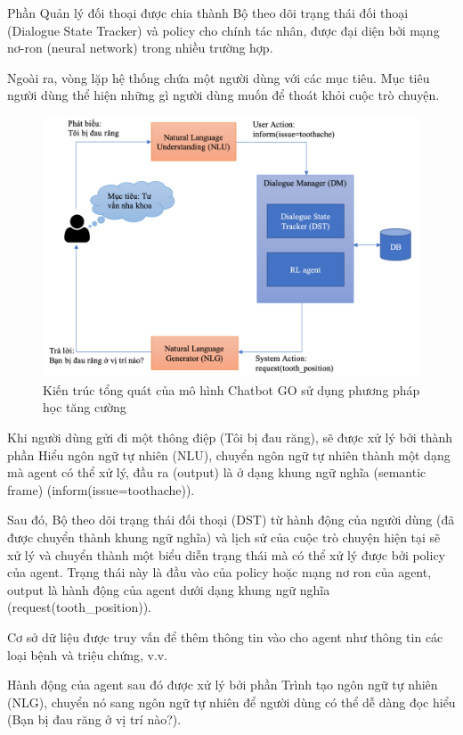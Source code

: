 Phần Quản lý đối thoại được chia thành Bộ theo dõi trạng thái
đối thoại (Dialogue State Tracker) và policy cho chính tác nhân,
được đại diện bởi mạng nơ-ron (neural network) trong nhiều trường hợp.

Ngoài ra, vòng lặp hệ thống chứa một người dùng với các mục tiêu.
Mục tiêu người dùng thể hiện những gì người dùng muốn để
thoát khỏi cuộc trò chuyện.

\begin{figure}[ht]
    \centering
    \includegraphics[width=1\textwidth]{thesis/chatbot-outline/kienthucnentang/chatbot.png}
    \caption{Kiến trúc tổng quát của mô hình Chatbot GO
    sử dụng phương pháp học tăng cường}
    \label{fig:chatbot}
\end{figure}

Khi người dùng gửi đi một thông điệp (Tôi bị đau răng), sẽ được xử lý
bởi thành phần Hiểu ngôn ngữ tự nhiên (NLU), chuyển ngôn ngữ tự nhiên
thành một dạng mà agent có thể xử lý, đầu ra (output) là ở dạng khung
ngữ nghĩa (semantic frame) (inform(issue=toothache)).

Sau đó, Bộ theo dõi trạng thái đối thoại (DST) từ hành động của
người dùng (đã được chuyển thành khung ngữ nghĩa) và lịch sử của
cuộc trò chuyện hiện tại sẽ xử lý và chuyển thành một biểu diễn
trạng thái mà có thể xử lý được bởi policy của agent. Trạng thái
này là đầu vào của policy hoặc mạng nơ ron của agent, output là
hành động của agent dưới dạng khung ngữ nghĩa (request(tooth\_position)).

Cơ sở dữ liệu được truy vấn để thêm thông tin vào cho agent
như thông tin các loại bệnh và triệu chứng, v.v.

Hành động của agent sau đó được xử lý bởi phần Trình tạo ngôn ngữ
tự nhiên (NLG), chuyển nó sang ngôn ngữ tự nhiên để người dùng
có thể dễ dàng đọc hiểu (Bạn bị đau răng ở vị trí nào?).

